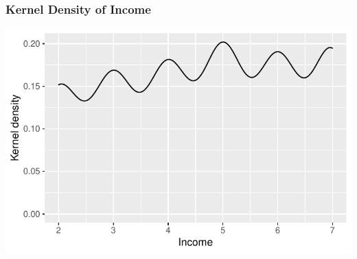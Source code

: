 \documentclass{beamer}\usepackage[]{graphicx}\usepackage[]{xcolor}
\makeatletter
\def\maxwidth{ %
  \ifdim\Gin@nat@width>\linewidth
    \linewidth
  \else
    \Gin@nat@width
  \fi
}
\newenvironment{knitrout}{}{} %
\makeatother
\begin{document}
\begin{frame}[fragile]\frametitle{Kernel Density of Income}
\begin{knitrout}\footnotesize
{}\color{fgcolor}

{\centering \includegraphics[width=\maxwidth]{figure/unnamed-chunk-67-1} 

}


\end{knitrout}
\end{frame}
\end{document}
